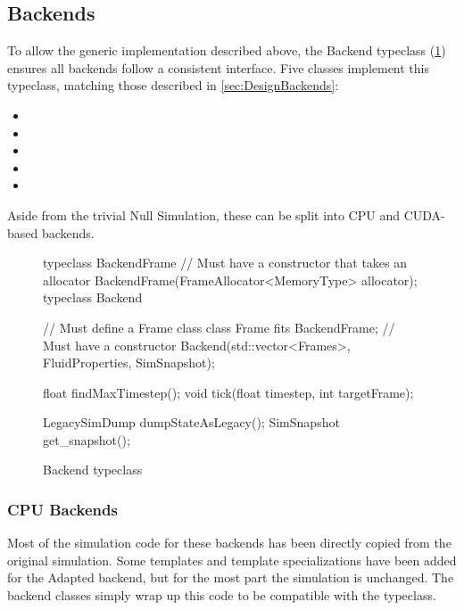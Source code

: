 \subsection{Backends}
To allow the generic implementation described above, the Backend typeclass (\cref{fig:TypeclassBackend}) ensures all backends follow a consistent interface.
Five classes implement this typeclass, matching those described in \cref{sec:DesignBackends}:
\begin{itemize}
    \item {}
    \item {}
    \item {}
    \item {}
    \item {}
\end{itemize}
Aside from the trivial Null Simulation, these can be split into CPU and CUDA-based backends.

\begin{figure}
    \centering
\begin{cppcode}
typeclass BackendFrame {
    // Must have a constructor that takes an allocator
    BackendFrame(FrameAllocator<MemoryType> allocator);
}
typeclass Backend {
    // Must define a Frame class
    class Frame fits BackendFrame;
    // Must have a constructor
    Backend(std::vector<Frames>, FluidProperties, SimSnapshot);
    
    float findMaxTimestep();
    void tick(float timestep, int targetFrame);
    
    LegacySimDump dumpStateAsLegacy();
    SimSnapshot get_snapshot();
}    
\end{cppcode}
    \caption{Backend typeclass}
    \label{fig:TypeclassBackend}
\end{figure}

\subsubsection{CPU Backends}
Most of the simulation code for these backends has been directly copied from the original simulation\cite{modules:CS257Coursework}\cite{modules:aca257submission}.
Some templates and template specializations have been added for the Adapted backend, but for the most part the simulation is unchanged.
The backend classes simply wrap up this code to be compatible with the typeclass.


